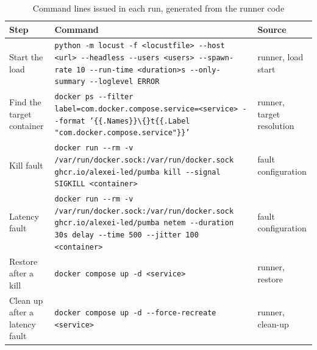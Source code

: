 \begin{table}[!t]
\centering
\caption{Command lines issued in each run, generated from the runner code}
\label{tab:tbl_ieee_commands}
\footnotesize
\setlength{\tabcolsep}{3pt}

\begin{tabular}{p{2.9cm}p{11.9cm}p{2.7cm}}
\toprule
\textbf{Step} & \textbf{Command} & \textbf{Source} \\
\midrule
Start the load & \texttt{python -m locust -f <locustfile> -{}-host <url> -{}-headless -{}-users <users> -{}-spawn-rate 10 -{}-run-time <duration>s -{}-only-summary -{}-loglevel ERROR} & runner, load start \\
Find the target container & \texttt{docker ps -{}-filter label=com.docker.compose.service=<service> -{}-format '\{\{.Names\}\}\textbackslash\{\}t\{\{.Label "com.docker.compose.service"\}\}'} & runner, target resolution \\
Kill fault & \texttt{docker run -{}-rm -v /var/run/docker.sock:/var/run/docker.sock ghcr.io/alexei-led/pumba kill -{}-signal SIGKILL <container>} & fault configuration \\
Latency fault & \texttt{docker run -{}-rm -v /var/run/docker.sock:/var/run/docker.sock ghcr.io/alexei-led/pumba netem -{}-duration 30s delay -{}-time 500 -{}-jitter 100 <container>} & fault configuration \\
Restore after a kill & \texttt{docker compose up -d <service>} & runner, restore \\
Clean up after a latency fault & \texttt{docker compose up -d -{}-force-recreate <service>} & runner, clean-up \\
\bottomrule
\end{tabular}
\end{table}
